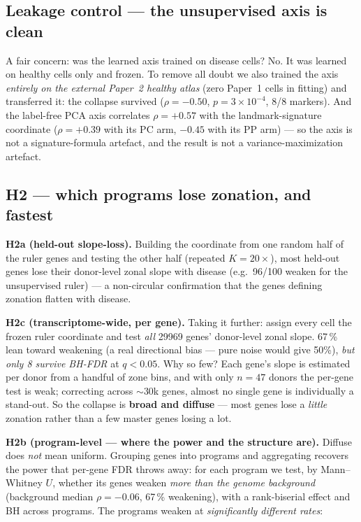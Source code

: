 \documentclass[11pt]{article}
\begin{document}
\subsection{Leakage control --- the unsupervised axis is clean}
A fair concern: was the learned axis trained on disease cells? No. It was learned on healthy cells
only and frozen. To remove all doubt we also trained the axis \emph{entirely on the external
Paper~2 healthy atlas} (zero Paper~1 cells in fitting) and transferred it: the collapse survived
($\rho=-0.50$, $p=3\times10^{-4}$, 8/8 markers). And the label-free PCA axis correlates $\rho=+0.57$ with the landmark-signature coordinate ($\rho=+0.39$ with its PC arm, $-0.45$ with its PP arm) --- so the axis is not a
signature-formula artefact, and the result is not a variance-maximization artefact.

\subsection{H2 --- which programs lose zonation, and fastest}
\textbf{H2a (held-out slope-loss).} Building the coordinate from one random half of the ruler genes
and testing the other half (repeated $K{=}20\times$), most held-out genes lose their donor-level
zonal slope with disease (e.g.\ 96/100 weaken for the unsupervised ruler) --- a non-circular
confirmation that the genes defining zonation flatten with disease.

\textbf{H2c (transcriptome-wide, per gene).} Taking it further: assign every cell the frozen ruler
coordinate and test \emph{all} 29969 genes' donor-level zonal slope. 67\,\% lean toward
weakening (a real directional bias --- pure noise would give 50\%), \emph{but only 8 survive
BH-FDR} at $q<0.05$. Why so few? Each gene's slope is estimated per donor from a handful of zone
bins, and with only $n{=}47$ donors the per-gene test is weak; correcting across $\sim$30k genes,
almost no single gene is individually a stand-out. So the collapse is \textbf{broad and diffuse} ---
most genes lose a \emph{little} zonation rather than a few master genes losing a lot.

\textbf{H2b (program-level --- where the power and the structure are).} Diffuse does \emph{not} mean
uniform. Grouping genes into programs and aggregating recovers the power that per-gene FDR throws
away: for each program we test, by Mann--Whitney $U$, whether its genes weaken \emph{more than the
genome background} (background median $\rho=-0.06$, 67\,\% weakening), with a rank-biserial
effect and BH across programs. The programs weaken at \emph{significantly different rates}:
\end{document}
